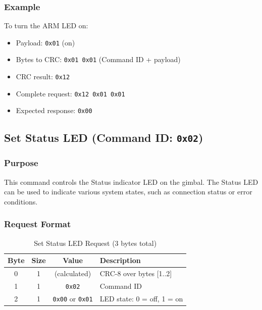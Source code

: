 \documentclass[12pt, titlepage]{article}
\begin{document}
\subsubsection{Example}

To turn the ARM LED on:
\begin{itemize}
  \item Payload: \texttt{0x01} (on)
  \item Bytes to CRC: \texttt{0x01 0x01} (Command ID + payload)
  \item CRC result: \texttt{0x12}
  \item Complete request: \texttt{0x12 0x01 0x01}
  \item Expected response: \texttt{0x00}
\end{itemize}

\subsection{Set Status LED (Command ID: \texttt{0x02})}

\subsubsection{Purpose}
This command controls the Status indicator LED on the gimbal. The Status LED
can be used to indicate various system states, such as connection status or
error conditions.

\subsubsection{Request Format}

\begin{table}[H]
  \centering
  \begin{tabular}{cccl}
    \toprule
    \textbf{Byte} & \textbf{Size} & \textbf{Value}                 & \textbf{Description}       \\
    \midrule
    0             & 1             & (calculated)                   & CRC-8 over bytes [1..2]    \\
    1             & 1             & \texttt{0x02}                  & Command ID                 \\
    2             & 1             & \texttt{0x00} or \texttt{0x01} & LED state: 0 = off, 1 = on \\
    \bottomrule
  \end{tabular}
  \caption{Set Status LED Request (3 bytes total)}
\end{table}
\end{document}
